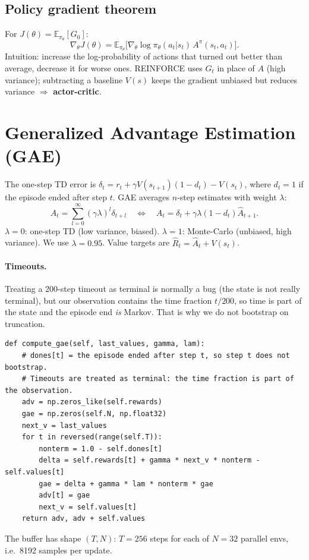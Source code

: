 \documentclass[11pt,a4paper]{article}
\newcommand{\E}{\mathbb{E}}
\newcommand{\code}[1]{\texttt{#1}}
\begin{document}
\subsection{Policy gradient theorem}
For $J(\theta)=\E_{\pi_\theta}[G_0]$:
\[
\nabla_\theta J(\theta)=\E_{\pi_\theta}\big[\nabla_\theta\log\pi_\theta(a_t|s_t)\,A^{\pi}(s_t,a_t)\big].
\]
Intuition: increase the log-probability of actions that turned out better than average,
decrease it for worse ones. REINFORCE uses $G_t$ in place of $A$ (high variance); subtracting a
baseline $V(s)$ keeps the gradient unbiased but reduces variance $\Rightarrow$ \textbf{actor-critic}.

\section{Generalized Advantage Estimation (GAE)}
The one-step TD error is $\delta_t=r_t+\gamma V(s_{t+1})(1-d_t)-V(s_t)$, where $d_t=1$ if the
episode ended after step $t$. GAE averages $n$-step estimates with weight $\lambda$:
\[
\hat A_t=\sum_{l=0}^{\infty}(\gamma\lambda)^l\delta_{t+l}
\quad\Longleftrightarrow\quad
\hat A_t=\delta_t+\gamma\lambda(1-d_t)\hat A_{t+1}.
\]
$\lambda=0$: one-step TD (low variance, biased). $\lambda=1$: Monte-Carlo (unbiased, high variance).
We use $\lambda=0.95$. Value targets are $\hat R_t=\hat A_t+V(s_t)$.

\paragraph{Timeouts.} Treating a 200-step timeout as terminal is normally a bug (the state is
not really terminal), but our observation contains the time fraction $t/200$, so time is part of the
state and the episode end \emph{is} Markov. That is why we do not bootstrap on truncation.

\begin{lstlisting}[title={\code{rl/ppo.py} -- RolloutBuffer.compute\_gae (exact)}]
def compute_gae(self, last_values, gamma, lam):
    # dones[t] = the episode ended after step t, so step t does not bootstrap.
    # Timeouts are treated as terminal: the time fraction is part of the observation.
    adv = np.zeros_like(self.rewards)
    gae = np.zeros(self.N, np.float32)
    next_v = last_values
    for t in reversed(range(self.T)):
        nonterm = 1.0 - self.dones[t]
        delta = self.rewards[t] + gamma * next_v * nonterm - self.values[t]
        gae = delta + gamma * lam * nonterm * gae
        adv[t] = gae
        next_v = self.values[t]
    return adv, adv + self.values
\end{lstlisting}
The buffer has shape $(T,N)$: $T=256$ steps for each of $N=32$ parallel envs, i.e.\ 8192 samples per update.
\end{document}
